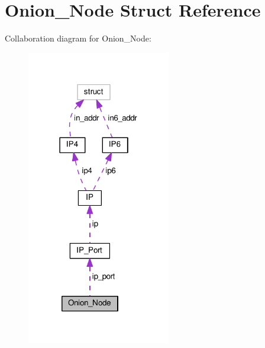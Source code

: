 \hypertarget{struct_onion___node}{\section{Onion\+\_\+\+Node Struct Reference}
\label{struct_onion___node}
}


Collaboration diagram for Onion\+\_\+\+Node\+:\nopagebreak
\begin{figure}[H]
\begin{center}
\leavevmode
\includegraphics[width=178pt]{struct_onion___node__coll__graph}
\end{center}
\end{figure}
